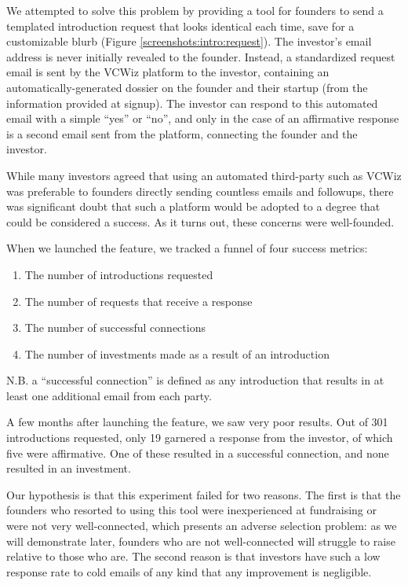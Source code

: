 We attempted to solve this problem by providing a tool for founders to send a templated introduction request that looks identical each time, save for a customizable blurb (Figure \ref{screenshots:intro:request}). The investor's email address is never initially revealed to the founder. Instead, a standardized request email is sent by the VCWiz platform to the investor, containing an automatically-generated dossier on the founder and their startup (from the information provided at signup). The investor can respond to this automated email with a simple ``yes'' or ``no'', and only in the case of an affirmative response is a second email sent from the platform, connecting the founder and the investor.

While many investors agreed that using an automated third-party such as VCWiz was preferable to founders directly sending countless emails and followups, there was significant doubt that such a platform would be adopted to a degree that could be considered a success. As it turns out, these concerns were well-founded.

When we launched the feature, we tracked a funnel of four success metrics:

\begin{enumerate}
  \item The number of introductions requested
  \item The number of requests that receive a response
  \item The number of successful connections
  \item The number of investments made as a result of an introduction
\end{enumerate}

N.B. a ``successful connection'' is defined as any introduction that results in at least one additional email from each party.

A few months after launching the feature, we saw very poor results. Out of 301 introductions requested, only 19 garnered a response from the investor, of which five were affirmative. One of these resulted in a successful connection, and none resulted in an investment.

Our hypothesis is that this experiment failed for two reasons. The first is that the founders who resorted to using this tool were inexperienced at fundraising or were not very well-connected, which presents an adverse selection problem: as we will demonstrate later, founders who are not well-connected will struggle to raise relative to those who are. The second reason is that investors have such a low response rate to cold emails of any kind that any improvement is negligible.

